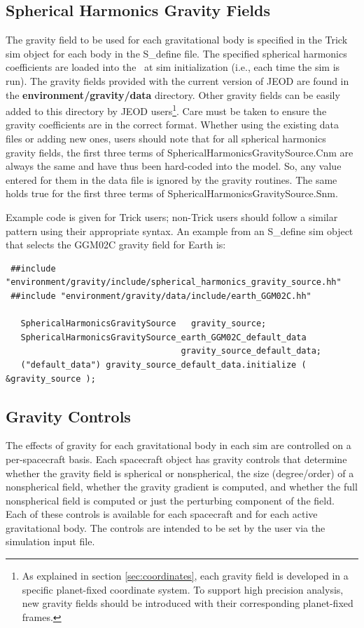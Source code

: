 \subsection{Spherical Harmonics Gravity Fields}
The gravity field to be used for each gravitational body is specified in the
Trick sim object for each body in the S\_define file. The specified spherical
harmonics coefficients are loaded into the \ModelDesc\ at sim initialization
(i.e., each time the sim is run). The gravity fields provided with the current
version of JEOD are found in the {\bf environment/gravity/data} directory. Other
gravity fields can be easily added to this directory by JEOD users\footnote{As
explained in section \ref{sec:coordinates}, each gravity field is developed in
a specific planet-fixed coordinate system. To support high precision analysis,
new gravity fields should be introduced with their corresponding planet-fixed
frames.}. Care must be taken to ensure the gravity coefficients are in the
correct format.  Whether using the existing data files or adding new ones, users
should note that for all spherical harmonics gravity fields, the first three
terms of SphericalHarmonicsGravitySource.Cnm are always the same and have thus
been hard-coded into the model. So, any value entered for them in the data file
is ignored by the gravity routines.  The same holds true for the first three
terms of SphericalHarmonicsGravitySource.Snm.

Example code is given for Trick users; non-Trick users should follow a similar
pattern using their appropriate syntax.  An example from an S\_define sim
object that selects the GGM02C gravity field for Earth is:

\begin{verbatim}
 ##include "environment/gravity/include/spherical_harmonics_gravity_source.hh"
 ##include "environment/gravity/data/include/earth_GGM02C.hh"

   SphericalHarmonicsGravitySource   gravity_source;
   SphericalHarmonicsGravitySource_earth_GGM02C_default_data
                                   gravity_source_default_data;
   ("default_data") gravity_source_default_data.initialize ( &gravity_source );
\end{verbatim}


\subsection{Gravity Controls}
The effects of gravity for each gravitational body in each sim are controlled
on a per-spacecraft basis.  Each spacecraft object has gravity controls that
determine whether the gravity field is spherical or nonspherical, the size
(degree/order) of a nonspherical field, whether the gravity gradient is
computed, and whether the full nonspherical field is computed or just the
perturbing component of the field.  Each of these controls is available for each
spacecraft and for each active gravitational body. The controls are intended
to be set by the user via the simulation input file.

